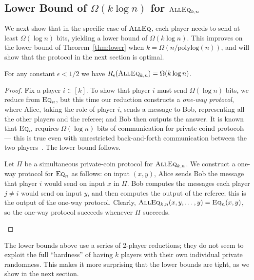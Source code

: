 \subsection*{Lower Bound of {\boldmath $\Omega(k \log n)$ for $\text{\textsc{AllEq}}_{k,n}$}}
We next show that in the specific case of $\text{\textsc{AllEq}}$, each player needs to send at least $\Omega(\log n)$ bits, yielding a lower bound of $\Omega(k \log n)$.
This improves on the lower bound of Theorem~\ref{thm:lower} when $k = \Omega(n/\mathrm{polylog}(n))$,
and will show that the protocol in the next section is optimal.
\begin{theorem}
	For any constant $\epsilon < 1/2$ we have $R_\epsilon(\text{\textsc{AllEq}}_{k,n}) = \Omega(k \log n)$.
\end{theorem}
\begin{proof}
	Fix a player $i \in [k]$. To show that player $i$ must send $\Omega(\log n)$ bits,
	we reduce from $\text{\textsc{Eq}}_n$, but this time our reduction constructs a \emph{one-way protocol},
	where Alice, taking the role of player $i$, sends a message to Bob, representing all the other players and the referee; and Bob then outputs the answer.
	It is known that $\text{\textsc{Eq}}_n$ requires $\Omega(\log n)$ bits of communication for private-coind protocols --- this is true
	even with unrestricted back-and-forth communication between the two players~\cite{KN96}.
	The lower bound follows.

	Let $\Pi$ be a simultaneous private-coin protocol for $\text{\textsc{AllEq}}_{k,n}$.
	We construct a one-way protocol for $\text{\textsc{Eq}}_n$ as follows:
	on input $(x,y)$, Alice sends Bob the message that player $i$ would send on input $x$ in $\Pi$.
	Bob computes the messages each player $j \neq i$ would send on input $y$,
	and then computes the output of the referee; this is the output of the one-way protocol.
	Clearly, $\text{\textsc{AllEq}}_{k,n}(x,y,\ldots,y) = \text{\textsc{Eq}}_n(x,y)$, so the one-way protocol succeeds whenever $\Pi$ succeeds.

	\label{thm:lower_k}
\end{proof}

The lower bounds above use a series of 2-player reductions; they do not seem to exploit the full ``hardness'' of having $k$ players with their own individual private randomness. This makes it more surprising that the lower bounds are tight, as we show in the next section.


